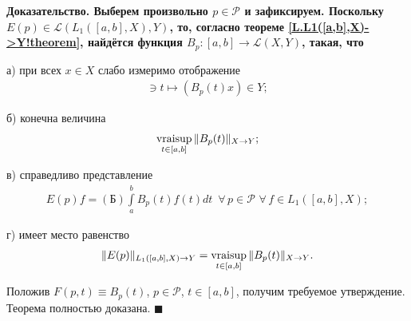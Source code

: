 \documentclass{report}
\newcounter{rem}[section]
\newcounter{theor}[section]
\newenvironment{Proof}{\par\noindent\bf Доказательство.\rm}{ $\blacksquare$\par}
\newcommand{\vraisup}{\mathop{\rm vraisup}}
\begin{document}
\begin{Proof}
Выберем произвольно $p\in\mathcal{P}$ и зафиксируем. Поскольку $E(p)\in\mathcal{L}(L_1([a,b],X),Y)$, то, согласно теореме \ref{L.L1([a,b],X)->Y!theorem}, найдётся функция
$B_p:[a,b]\to\mathcal{L}(X,Y)$, такая, что

а) при всех $x\in X$ слабо измеримо отображение
\begin{gather*}
[a,b]\ni t\mapsto (B_p(t)x)\in Y;
\end{gather*}

б) конечна величина
\begin{gather*}
\vraisup\limits_{t\in[a,b]}\|B_p(t)\|_{X\to Y};
\end{gather*}

в) справедливо представление
\begin{gather*}
E(p)f=(\textrm{Б})\int\limits_a^bB_p(t)f(t)dt\,\,\,\forall\,p\in\mathcal{P}\,\,\forall\,f\in L_1([a,b],X);
\end{gather*}

г) имеет место равенство
\begin{gather*}
\|E(p)\|_{L_1([a,b],X)\to Y}=\vraisup\limits_{t\in[a,b]}\|B_p(t)\|_{X\to Y}.
\end{gather*}

Положив $F(p,t)\equiv B_p(t)$, $p\in\mathcal{P}$, $t\in[a,b]$, получим требуемое утверждение. Теорема полностью доказана.
\end{Proof}
\end{document}
